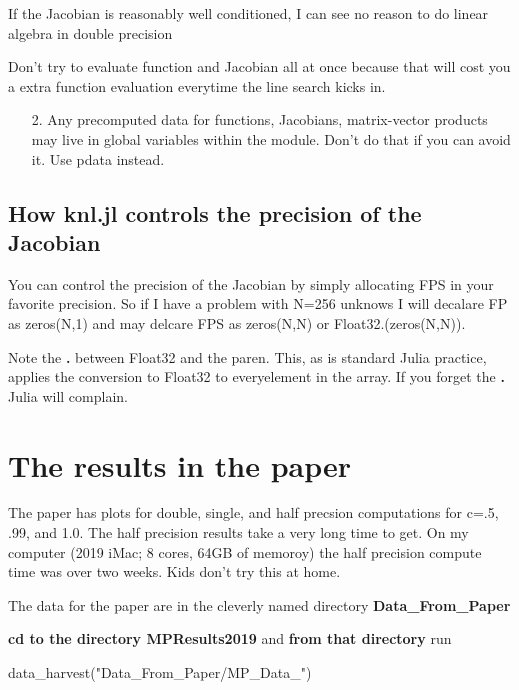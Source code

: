\documentclass[11pt]{article}
\newenvironment{Shaded}{}{}
\newcommand{\StringTok}[1]{\textcolor[rgb]{0.25,0.44,0.63}{{#1}}}
\newcommand{\NormalTok}[1]{{#1}}
\begin{document}
If the Jacobian is reasonably well conditioned, I can see no reason to do linear algebra in double precision

Don't try to evaluate function and Jacobian all at once because  that will cost you a extra function evaluation everytime the line search kicks in.

\begin{itemize}
\item[2. ] Any precomputed data for functions, Jacobians, matrix-vector products may live in global variables within the module. Don't do that if you can avoid it. Use pdata instead.

\end{itemize}


    

    \hypertarget{how-knl.jl-controls-the-precision-of-the-jacobian}{%
\subsection{How knl.jl controls the precision of the
Jacobian}\label{how-knl.jl-controls-the-precision-of-the-jacobian}}

You can control the precision of the Jacobian by simply allocating FPS
in your favorite precision. So if I have a problem with N=256 unknows I
will decalare FP as zeros(N,1) and may delcare FPS as zeros(N,N) or
Float32.(zeros(N,N)).

Note the \textbf{.} between Float32 and the paren. This, as is standard
Julia practice, applies the conversion to Float32 to everyelement in the
array. If you forget the \textbf{.} Julia will complain.

    \hypertarget{the-results-in-the-paper}{%
\section{The results in the paper}\label{the-results-in-the-paper}}

The paper has plots for double, single, and half precsion computations
for c=.5, .99, and 1.0. The half precision results take a very long time
to get. On my computer (2019 iMac; 8 cores, 64GB of memoroy) the half
precision compute time was over two weeks. Kids don't try this at home.

The data for the paper are in the cleverly named directory
\textbf{Data\_From\_Paper}

\textbf{cd to the directory MPResults2019} and \textbf{from that
directory} run

\begin{Shaded}
\begin{Highlighting}[]
\NormalTok{data_harvest(}\StringTok{"Data_From_Paper/MP_Data_"}\NormalTok{) }
\end{Highlighting}
\end{Shaded}
\end{document}
